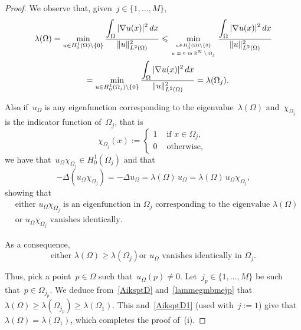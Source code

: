 \documentclass[12pt,a4paper,intlimits,sumlimits]{amsart}
\def \R {\mathbb{R}}
\theoremstyle{definition}
\theoremstyle{plain}
\numberwithin{equation}{section}
\renewcommand{\le}{\leqslant}
\renewcommand{\ge}{\geqslant}
\begin{document}
\begin{appendix}
\begin{proof} 
We observe that, given~$j\in\{1,\dots,M\}$,
\begin{equation}\label{AiksptD1}\begin{split}
& \lambda(\Omega)=\min_{u\in H^1_0(\Omega)\setminus\{0\}}\frac{\displaystyle\int_\Omega|\nabla u(x)|^2\,dx}{\|u\|^2_{L^2(\Omega)}}
\le\min_{{u\in H^1_0(\Omega)\setminus\{0\}}\atop{\tiny{\mbox{$u\equiv0$ in~$\R^N\setminus\Omega_j$}}}}
\frac{\displaystyle\int_\Omega|\nabla u(x)|^2\,dx}{\|u\|^2_{L^2(\Omega)}}\\&\qquad\qquad\qquad=
\min_{u\in H^1_0(\Omega_j)\setminus\{0\}}\frac{\displaystyle\int_\Omega|\nabla u(x)|^2\,dx}{\|u\|^2_{L^2(\Omega)}}
=\lambda(\Omega_j).
\end{split}\end{equation}

Also
if~$u_\Omega$ is any eigenfunction corresponding to the eigenvalue~$\lambda(\Omega)$
and~$\chi_{\Omega_j}$ is the indicator function of~$\Omega_j$,
that is
$$ \chi_{\Omega_j}(x):=\begin{cases}1&{\mbox{ if }}x\in\Omega_j,\\
0&{\mbox{ otherwise, }}\end{cases}$$
we have that~$u_\Omega\chi_{\Omega_j}\in H^1_0(\Omega_j)$ and that
$$-\Delta(u_\Omega\chi_{\Omega_j})=-\Delta u_\Omega=\lambda(\Omega)\,u_\Omega
=\lambda(\Omega)\,u_\Omega\chi_{\Omega_j},$$
showing that \begin{equation}\label{AB7}\begin{split}&{\mbox{either~$u_\Omega\chi_{\Omega_j}$ is an eigenfunction in~$\Omega_j$ corresponding to
the eigenvalue~$\lambda(\Omega)$}}\\&{\mbox{or~$u_\Omega\chi_{\Omega_j}$ vanishes identically.}}\end{split}\end{equation}

As a consequence, 
\begin{equation}\label{AiksptD}
{\mbox{either~$\lambda(\Omega)\ge\lambda(\Omega_j)$
or~$u_\Omega$ vanishes identically in~$\Omega_j$.}}\end{equation}

Thus, pick a point~$p\in\Omega$ such that~$u_\Omega(p)\ne0$.
Let~$j_p\in\{1,\dots,M\}$ be such that~$p\in\Omega_{j_p}$. We deduce from~\eqref{AiksptD}
and~\eqref{lammegmbmejp}
that~$\lambda(\Omega)\ge\lambda(\Omega_{j_p})\ge\lambda(\Omega_1)$.
This and~\eqref{AiksptD1} (used with~$j:=1$) give that~$\lambda(\Omega)=\lambda(\Omega_1)$,
which completes the proof of~(i).


\end{proof}
\end{appendix}
\end{document}
